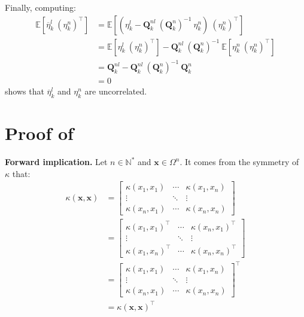 Finally, computing:
\begin{equation}
	\begin{aligned}
	\mathbb{E}\left[\overline{\eta}_k^l\:(\eta_k^n)^\top\right]&=\mathbb{E}\left[(\eta_k^l-\mathbf{Q}_k^{nl}\:(\mathbf{Q}_k^n)^{-1}\:\eta_k^n)\:(\eta_k^n)^\top\right]\\
	&=\mathbb{E}\left[\eta_k^l\:(\eta_k^n)^\top\right]-\mathbf{Q}_k^{nl}\:(\mathbf{Q}_k^n)^{-1}\:\mathbb{E}\left[\eta_k^n\:(\eta_k^n)^\top\right]\\
	&=\mathbf{Q}_k^{nl}-\mathbf{Q}_k^{nl}\:(\mathbf{Q}_k^n)^{-1}\:\mathbf{Q}_k^n\\
	&=0
	\end{aligned}
\end{equation}
shows that $\overline{\eta}_k^l$ and $\eta_k^n$ are uncorrelated.

\section[Proof of Proposition 3.2]{Proof of }\label{sec:proof_definite_kernels}

\textbf{Forward implication.} Let $n\in\mathbb{N}^*$ and $\mathbf{x}\in\Omega^n$. It comes from the symmetry of $\kappa$ that:
\begin{equation}
	\begin{aligned}
	\kappa(\mathbf{x},\mathbf{x})&=\begin{bmatrix}
	\kappa(x_1,x_1)&\cdots&\kappa(x_1,x_n)\\\vdots&\ddots&\vdots\\\kappa(x_n,x_1)&\cdots&\kappa(x_n,x_n)
	\end{bmatrix}\\
	&=\begin{bmatrix}
	\kappa(x_1,x_1)^\top&\cdots&\kappa(x_n,x_1)^\top\\\vdots&\ddots&\vdots\\\kappa(x_1,x_n)^\top&\cdots&\kappa(x_n,x_n)^\top
	\end{bmatrix}\\
	&=\begin{bmatrix}
	\kappa(x_1,x_1)&\cdots&\kappa(x_1,x_n)\\\vdots&\ddots&\vdots\\\kappa(x_n,x_1)&\cdots&\kappa(x_n,x_n)
	\end{bmatrix}^\top\\
	&=\kappa(\mathbf{x},\mathbf{x})^\top
	\end{aligned}
\end{equation}

